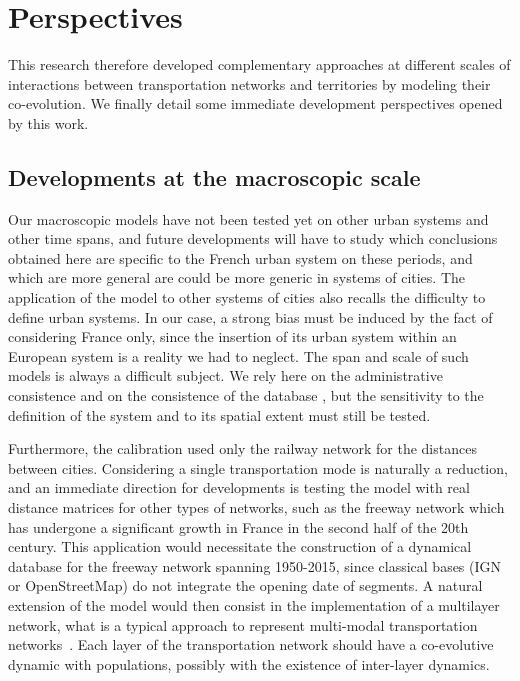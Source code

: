 \documentclass[11pt]{article}
\begin{document}
\section{Perspectives}

This research therefore developed complementary approaches at different scales of interactions between transportation networks and territories by modeling their co-evolution. We finally detail some immediate development perspectives opened by this work.


\subsection{Developments at the macroscopic scale}


Our macroscopic models have not been tested yet on other urban systems and other time spans, and future developments will have to study which conclusions obtained here are specific to the French urban system on these periods, and which are more general are could be more generic in systems of cities. The application of the model to other systems of cities also recalls the difficulty to define urban systems. In our case, a strong bias must be induced by the fact of considering France only, since the insertion of its urban system within an European system is a reality we had to neglect. The span and scale of such models is always a difficult subject. We rely here on the administrative consistence and on the consistence of the database \citep{pumain1986fichier}, but the sensitivity to the definition of the system and to its spatial extent must still be tested.


Furthermore, the calibration used only the railway network for the distances between cities. Considering a single transportation mode is naturally a reduction, and an immediate direction for developments is testing the model with real distance matrices for other types of networks, such as the freeway network which has undergone a significant growth in France in the second half of the 20th century. This application would necessitate the construction of a dynamical database for the freeway network spanning 1950-2015, since classical bases (IGN or OpenStreetMap) do not integrate the opening date of segments. A natural extension of the model would then consist in the implementation of a multilayer network, what is a typical approach to represent multi-modal transportation networks~\citep{gallotti2014anatomy}. Each layer of the transportation network should have a co-evolutive dynamic with populations, possibly with the existence of inter-layer dynamics.
\end{document}
